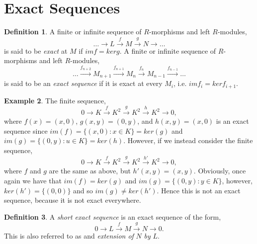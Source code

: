 \documentclass[11.5pt, twoside, a4paper, titlepage]{report}
\theoremstyle{definition}
\newtheorem{mydef}{Definition}[section]
\newtheorem{eg}[mydef]{Example}
\theoremstyle{plain}
\begin{document}

\section{Exact Sequences}

\begin{mydef}
A finite or infinite sequence of $R$-morphisms and left $R$-modules,
\begin{equation*}
\dots \xrightarrow{} L \xrightarrow{f}M \xrightarrow{g} N \xrightarrow{} \dots
\end{equation*}
is said to be \emph{exact} at $M$ if $imf=kerg$. A finite or infinite sequence of $R$-morphisms and left $R$-modules,
\begin{equation*}
\dots \xrightarrow{f_{n+2}} M_{n+1} \xrightarrow{f_{n+1}} M_n \xrightarrow{f_n} M_{n-1} \xrightarrow{f_{n-1}} \dots
\end{equation*}
is said to be an \emph{exact sequence} if it is exact at every $M_i$, i.e. $imf_i=kerf_{i+1}$. 
\end{mydef}

\begin{eg}
The finite sequence,
\begin{equation*}
0\xrightarrow{}K\xrightarrow{f}K^2\xrightarrow{g}K^2\xrightarrow{h}K^2\xrightarrow{}0,
\end{equation*}
where $f(x)=(x,0)$, $g(x, y)=(0,y)$, and $h(x,y)=(x,0)$ is an exact sequence since $im(f)=\{(x,0):x\in K\}=ker(g)$ and $im(g)=\{(0,y):u\in K\}=ker(h)$. 
However, if we instead consider the finite sequence, 
\begin{equation*}
0\xrightarrow{}K\xrightarrow{f}K^2\xrightarrow{g}K^2\xrightarrow{h'}K^2\xrightarrow{}0,
\end{equation*}
where $f$ and $g$ are the same as above, but $h'(x,y)=(x,y)$. Obviously, once again we have that $im(f)=ker(g)$ and $im(g)=\{(0,y):y\in K\}$, however, $ker(h')=\{(0,0)\}$ and so $im(g)\neq ker(h')$. Hence this is not an exact sequence, because it is not exact everywhere.
\end{eg}


\begin{mydef}
A \emph{short exact sequence} is an exact sequence of the form,
\begin{equation*}
0\xrightarrow{}L\xrightarrow{f}M\xrightarrow{g}N\xrightarrow{}0.
\end{equation*}
This is also referred to as and \emph{extension of} $N$ \emph{by} $L$.
\end{mydef}
\end{document}
